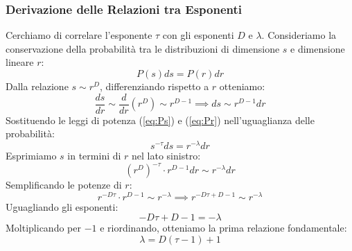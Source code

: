 \subsubsection{Derivazione delle Relazioni tra Esponenti}

Cerchiamo di correlare l'esponente $\tau$ con gli esponenti $D$ e $\lambda$.
Consideriamo la conservazione della probabilità tra le distribuzioni di dimensione $s$ e dimensione lineare $r$:
\begin{equation}
    P(s) ds = P(r) dr
\end{equation}
Dalla relazione $s \sim r^D$, differenziando rispetto a $r$ otteniamo:
\begin{equation}
    \frac{ds}{dr} \sim \frac{d}{dr}(r^D) \sim r^{D-1} \implies ds \sim r^{D-1} dr
\end{equation}
Sostituendo le leggi di potenza (\ref{eq:Ps}) e (\ref{eq:Pr}) nell'uguaglianza delle probabilità:
\begin{equation}
    s^{-\tau} ds = r^{-\lambda} dr
\end{equation}
Esprimiamo $s$ in termini di $r$ nel lato sinistro:
\begin{equation}
    (r^D)^{-\tau} \cdot r^{D-1} dr \sim r^{-\lambda} dr
\end{equation}
Semplificando le potenze di $r$:
\begin{equation}
    r^{-D\tau} \cdot r^{D-1} \sim r^{-\lambda} \implies r^{-D\tau + D - 1} \sim r^{-\lambda}
\end{equation}
Uguagliando gli esponenti:
\begin{equation}
    -D\tau + D - 1 = -\lambda
\end{equation}
Moltiplicando per $-1$ e riordinando, otteniamo la prima relazione fondamentale:
\begin{equation}
    \lambda = D(\tau - 1) + 1
\end{equation}

